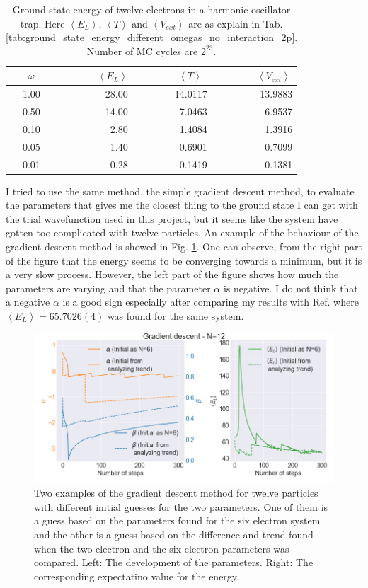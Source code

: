 \begin{table}[H]\caption{Ground state energy of twelve electrons in a harmonic oscillator trap. Here $\left< E_L \right>$, $\left< T \right>$ and $\left< V_{ext}\right>$  are as explain in Tab. \ref{tab:ground_state_energy_different_omegas_no_interaction_2p}. Number of MC cycles are $2^{23}$. }\label{tab:ground_state_energy_importance_12p}
\center
\begin{tabular}{c|rrr}
$\omega$ & $\left< E_L \right>$  & $\left< T \right>\,\,\,$  & $\left< V_{ext}\right>\,$ \\ \hline
1.00 & 28.00 & 14.0117 & 13.9883\\ 
0.50 & 14.00 & 7.0463 & 6.9537\\ 
0.10 & 2.80 & 1.4084 & 1.3916\\ 
0.05 & 1.40 & 0.6901 & 0.7099\\ 
0.01 & 0.28 & 0.1419 & 0.1381\\ 
\end{tabular}
\end{table}

I tried to use the same method, the simple gradient descent method, to evaluate the parameters that gives me the closest thing to the ground state I can get with the trial wavefunction used in this project, but it seems like the system have gotten too complicated with twelve particles. An example of the behaviour of the gradient descent method is showed in Fig. \ref{fig:gradient_descent_12p}. One can observe, from the right part of the figure that the energy seems to be converging towards a minimum, but it is a very slow process. However, the left part of the figure shows how much the parameters are varying and that the parameter $\alpha$ is negative. I do not think that a negative $\alpha$ is a good sign especially after comparing my results with Ref. \cite{Evens_master} where $\left< E_L \right> = 65.7026(4)$ was found for the same system. 

\begin{figure}[H]
\center
\includegraphics[width=0.85\linewidth]{../Results/gradient_descent_12p}\caption{Two examples of the gradient descent method for twelve particles with different initial guesses for the two parameters. One of them is a guess based on the parameters found for the six electron system and the other is a guess based on the difference and trend found when the two electron and the six electron parameters was compared. Left: The development of the parameters. Right: The corresponding expectatino value for the energy. }\label{fig:gradient_descent_12p}
\end{figure}

